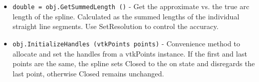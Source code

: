 \begin{itemize}
\item  \verb|double = obj.GetSummedLength ()| -  Get the approximate vs. the true arc length of the spline. Calculated as
 the summed lengths of the individual straight line segments. Use
 SetResolution to control the accuracy.

\item  \verb|obj.InitializeHandles (vtkPoints points)| -  Convenience method to allocate and set the handles from a vtkPoints
 instance.  If the first and last points are the same, the spline sets
 Closed to the on state and disregards the last point, otherwise Closed
 remains unchanged.

\end{itemize}
